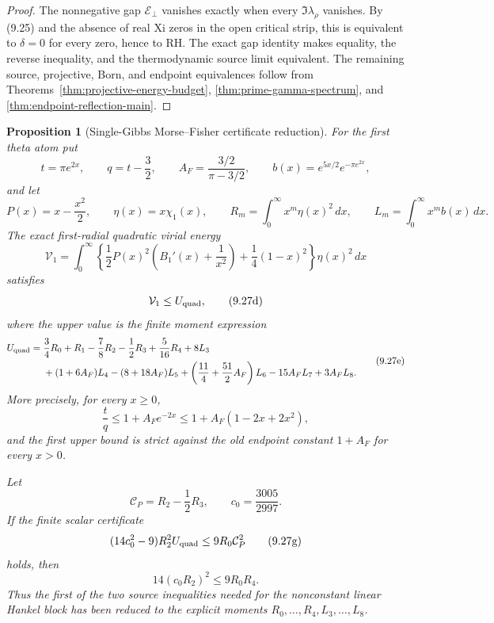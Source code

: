 \documentclass[11pt]{article}
\newtheorem{proposition}[theorem]{Proposition}
\begin{document}
\begin{proof}
The nonnegative gap $\mathcal E_\perp$ vanishes exactly when every
$\Im\lambda_\rho$ vanishes.  By \textup{(9.25)} and the absence of real Xi zeros in the open
critical strip, this is equivalent to $\delta=0$ for every zero, hence to RH.  The exact gap
identity makes equality, the reverse inequality, and the thermodynamic source limit equivalent.
The remaining source, projective, Born, and endpoint equivalences follow from
Theorems~\ref{thm:projective-energy-budget}, \ref{thm:prime-gamma-spectrum}, and
\ref{thm:endpoint-reflection-main}.
\end{proof}

\begin{proposition}[Single-Gibbs Morse--Fisher certificate reduction]
\label{prop:morse-fisher-envelope}
For the first theta atom put
\[
 t=\pi e^{2x},\qquad q=t-\frac32,\qquad
 A_F=\frac{3/2}{\pi-3/2},\qquad
 b(x)=e^{5x/2}e^{-\pi e^{2x}},
 \tag{9.27a}
\]
and let
\[
 P(x)=x-\frac{x^2}{2},\qquad \eta(x)=x\chi_1(x),\qquad
 R_m=\int_0^\infty x^m\eta(x)^2\,dx,\qquad
 L_m=\int_0^\infty x^m b(x)\,dx.
 \tag{9.27b}
\]
The exact first-radial quadratic virial energy
\[
 \mathcal V_1=
 \int_0^\infty
 \left\{\frac12P(x)^2\left(B_1'(x)+\frac1{x^2}\right)
       +\frac14(1-x)^2\right\}\eta(x)^2\,dx
 \tag{9.27c}
\]
satisfies
\[
 \mathcal V_1\le U_{\rm quad},
 \tag{9.27d}
\]
where the upper value is the finite moment expression
\[
\begin{aligned}
 U_{\rm quad}={}&
 \frac34R_0+R_1-\frac78R_2-\frac12R_3+\frac5{16}R_4+8L_3\\
 &+(1+6A_F)L_4-(8+18A_F)L_5
 +\left(\frac{11}{4}+\frac{51}{2}A_F\right)L_6
 -15A_FL_7+3A_FL_8.
\end{aligned}
 \tag{9.27e}
\]
More precisely, for every $x\ge0$,
\[
 \frac{t}{q}\le1+A_Fe^{-2x}\le1+A_F(1-2x+2x^2),
 \tag{9.27f}
\]
and the first upper bound is strict against the old endpoint constant $1+A_F$ for every
$x>0$.

Let
\[
 \mathcal C_P=R_2-\frac12R_3,
 \qquad c_0=\frac{3005}{2997}.
\]
If the finite scalar certificate
\[
 (14c_0^2-9)R_2^2U_{\rm quad}\le9R_0\mathcal C_P^2
 \tag{9.27g}
\]
holds, then
\[
 14(c_0R_2)^2\le9R_0R_4.
 \tag{9.27h}
\]
Thus the first of the two source inequalities needed for the nonconstant linear Hankel block has
been reduced to the explicit moments $R_0,\ldots,R_4,L_3,\ldots,L_8$.


\end{proposition}
\end{document}
